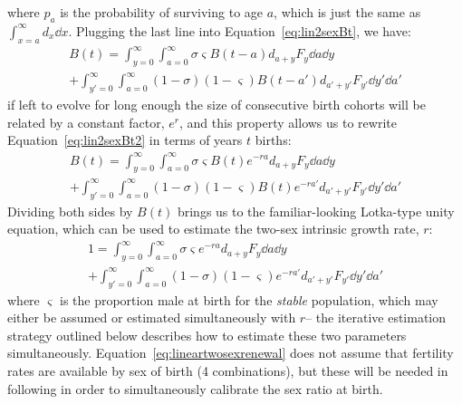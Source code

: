 where $p_a$ is the probability of surviving to age $a$, which is just the same
as $\int_{x=a}^\infty d_x \dd x$. Plugging the last line into
Equation~\eqref{eq:lin2sexBt}, we have:
\begin{equation}
\begin{split}
\label{eq:lin2sexBt2}
B(t) = \int_{y=0}^\infty \int_{a=0}^\infty \sigma \varsigma B(t-a)d_{a+y} 
F_y \dd a \dd y \\+ \int_{y'=0}^\infty \int_{a=0}^\infty (1-\sigma)
(1-\varsigma) B(t-a')d_{a'+y'} F_{y'} \dd y' \dd a'
\end{split}
\end{equation}
if left to evolve for long enough the size of consecutive birth cohorts will be
related by a constant factor, $e^r$, and this property allows us to rewrite
Equation~\eqref{eq:lin2sexBt2} in terms of years $t$ births:
\begin{equation}
\begin{split}
\label{eq:lin2sexBt3}
B(t) = \int_{y=0}^\infty \int_{a=0}^\infty \sigma \varsigma B(t)e^{-ra}d_{a+y} 
F_y \dd a \dd y \\+ \int_{y'=0}^\infty \int_{a=0}^\infty (1-\sigma)
(1-\varsigma) B(t)e^{-ra'}d_{a'+y'} F_{y'} \dd y' \dd a'
\end{split}
\end{equation} 
Dividing both sides by $B(t)$ brings us to the familiar-looking
Lotka-type unity equation, which can be used to estimate the two-sex intrinsic
growth rate, $r$:
\begin{equation}
\begin{split}
\label{eq:lineartwosexrenewal}
1 = \int_{y=0}^\infty \int_{a=0}^\infty \sigma \varsigma e^{-ra}d_{a+y} 
F_y \dd a \dd y \\+ \int_{y'=0}^\infty \int_{a=0}^\infty (1-\sigma)
(1-\varsigma) e^{-ra'}d_{a'+y'} F_{y'} \dd y' \dd a'
\end{split}
\end{equation} 
where $\varsigma$ is the proportion male at birth for the \textit{stable}
population, which may either be assumed or estimated simultaneously with $r$-- the 
iterative estimation strategy outlined below describes how to estimate these two
parameters simultaneously. Equation~\eqref{eq:lineartwosexrenewal} does 
not assume that fertility rates are
available by sex of birth (4 combinations), but these will be needed in
following in order to simultaneously calibrate the sex ratio at birth.

